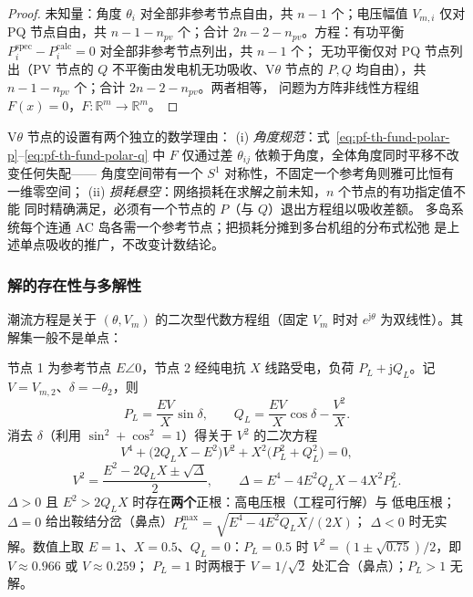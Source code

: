 \begin{proof}
未知量：角度 $\theta_i$ 对全部非参考节点自由，共 $n-1$ 个；电压幅值 $V_{m,i}$
仅对 PQ 节点自由，共 $n-1-n_{pv}$ 个；合计 $2n-2-n_{pv}$。方程：有功平衡
$P_i^{\mathrm{spec}}-P_i^{\mathrm{calc}}=0$ 对全部非参考节点列出，共 $n-1$ 个；
无功平衡仅对 PQ 节点列出（PV 节点的 $Q$ 不平衡由发电机无功吸收、V$\theta$
节点的 $P,Q$ 均自由），共 $n-1-n_{pv}$ 个；合计 $2n-2-n_{pv}$。两者相等，
问题为方阵非线性方程组 $F(x)=0$，$F:\mathbb R^m\to\mathbb R^m$。
\end{proof}

\begin{remark}[参考节点的双重必要性]\label{rem:pf-th-fund-slack}
V$\theta$ 节点的设置有两个独立的数学理由：
(i) \emph{角度规范}：式~\eqref{eq:pf-th-fund-polar-p}--\eqref{eq:pf-th-fund-polar-q}
中 $F$ 仅通过差 $\theta_{ij}$ 依赖于角度，全体角度同时平移不改变任何失配——
角度空间带有一个 $S^1$ 对称性，不固定一个参考角则雅可比恒有一维零空间；
(ii) \emph{损耗悬空}：网络损耗在求解之前未知，$n$ 个节点的有功指定值不能
同时精确满足，必须有一个节点的 $P$（与 $Q$）退出方程组以吸收差额。
多岛系统每个连通 AC 岛各需一个参考节点；把损耗分摊到多台机组的分布式松弛
是上述单点吸收的推广，不改变计数结论。
\end{remark}

\subsubsection{解的存在性与多解性}

潮流方程是关于 $(\theta,V_m)$ 的二次型代数方程组（固定 $V_m$ 时对
$e^{\mathrm j\theta}$ 为双线性）。其解集一般不是单点：

\begin{example}[两节点系统的解析解与鼻点]\label{ex:pf-th-fund-twobus}
节点 1 为参考节点 $E\angle0$，节点 2 经纯电抗 $X$ 线路受电，负荷
$P_L+\mathrm jQ_L$。记 $V=V_{m,2}$、$\delta=-\theta_2$，则
\begin{equation}
P_L=\frac{EV}{X}\sin\delta,\qquad
Q_L=\frac{EV}{X}\cos\delta-\frac{V^2}{X}.
\end{equation}
消去 $\delta$（利用 $\sin^2+\cos^2=1$）得关于 $V^2$ 的二次方程
\begin{equation}
V^4+\bigl(2Q_LX-E^2\bigr)V^2+X^2\bigl(P_L^2+Q_L^2\bigr)=0,
\label{eq:pf-th-fund-v4}
\end{equation}
\begin{equation}
V^2=\frac{E^2-2Q_LX\pm\sqrt{\Delta}}{2},\qquad
\Delta=E^4-4E^2Q_LX-4X^2P_L^2 .
\label{eq:pf-th-fund-v2}
\end{equation}
$\Delta>0$ 且 $E^2>2Q_LX$ 时存在\textbf{两个}正根：高电压根（工程可行解）与
低电压根；$\Delta=0$ 给出鞍结分岔（鼻点）$P_L^{\max}=\sqrt{E^4-4E^2Q_LX}/(2X)$；
$\Delta<0$ 时无实解。数值上取 $E=1$、$X=0.5$、$Q_L=0$：$P_L=0.5$ 时
$V^2=(1\pm\sqrt{0.75})/2$，即 $V\approx0.966$ 或 $V\approx0.259$；
$P_L=1$ 时两根于 $V=1/\sqrt2$ 处汇合（鼻点）；$P_L>1$ 无解。
\end{example}

